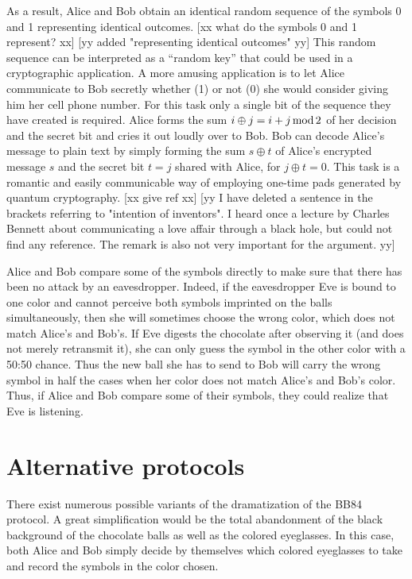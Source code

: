 \documentclass[prb,amssymb,preprint]{revtex4}
\begin{document}
As a result, Alice and Bob obtain an identical random sequence of the
symbols 0 and 1 representing identical outcomes.
[xx what do the symbols 0 and 1 represent? xx]
[yy added "representing identical outcomes" yy]
This random
sequence can be interpreted as a ``random key'' that could be used in a
cryptographic application. A more amusing application is to let Alice
communicate to Bob secretly whether (1) or not (0) she would consider giving
him her cell phone number. For this task only a single bit of the
sequence they have created is required. Alice forms the sum $i\oplus j= i+j
\,{\rm mod}\, 2$ of her decision and the secret bit and cries it out loudly
over to Bob. Bob can decode Alice's message to plain text by simply forming
the sum $s\oplus t$ of Alice's encrypted message $s$ and the secret bit
$t=j$ shared with Alice, for $j\oplus t=0$. This task is a
romantic and easily communicable way of employing one-time pads generated by
quantum cryptography.
[xx give ref xx]
[yy I have deleted a sentence in the brackets referring to "intention of inventors".
I heard once a lecture by Charles Bennett about communicating a love affair
through a black hole, but could not find any reference. The remark is also
not very important for the argument. yy]

Alice and Bob compare some of the symbols directly to make sure that
there has been no attack by an eavesdropper. Indeed, if the eavesdropper Eve
is bound to one color and cannot perceive both symbols imprinted on the balls
simultaneously, then she will sometimes choose the wrong color, which does
not match Alice's and Bob's. If Eve digests the chocolate after observing
it (and does not merely retransmit it), she can only guess the symbol in the
other color with a 50:50 chance. Thus the new ball she has to send to Bob
will carry the wrong symbol in half the cases when her color does not
match Alice's and Bob's color. Thus, if Alice and Bob compare some of their
symbols, they could realize that Eve is listening.

\section{Alternative protocols}

There exist numerous possible variants of the dramatization of the BB84
protocol. A great simplification would be the total abandonment of the black
background of the chocolate balls as well as the colored eyeglasses. In
this case, both Alice and Bob simply decide by themselves which colored
eyeglasses to take and record the symbols in the color chosen.
\end{document}
